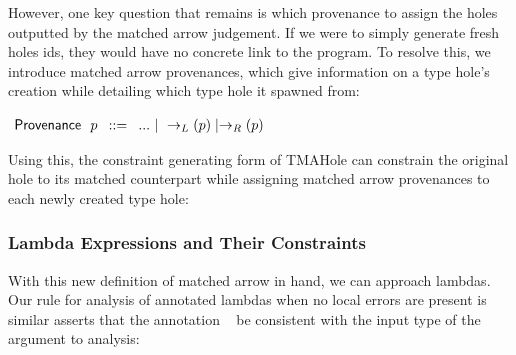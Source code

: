 However, one key question that remains is which provenance to assign the holes outputted by the matched arrow judgement. If we were to simply generate fresh holes ids, they would have no concrete link to the program. To resolve this, we introduce matched arrow provenances, which give information on a type hole's creation while detailing which type hole it spawned from:
\begin{center}
    $\arraycolsep=4pt\begin{array}{lll}
    \Prov~~ p & ::= & 
        ... ~\vert~ 
        \rightarrow_L(\Provp) \mid \rightarrow_R(\Provp)
        \\
    \end{array}$
\end{center}

Using this, the constraint generating form of TMAHole can constrain the original hole to its matched counterpart while assigning matched arrow provenances to each newly created type hole:

\begin{mathpar}
\end{mathpar}

\subsubsection{Lambda Expressions and Their Constraints}
With this new definition of matched arrow in hand, we can approach lambdas. Our rule for analysis of annotated lambdas when no local errors are present is similar asserts that the annotation \TMV~ be consistent with the input type of the argument to analysis:

\begin{mathpar}
\end{mathpar}

